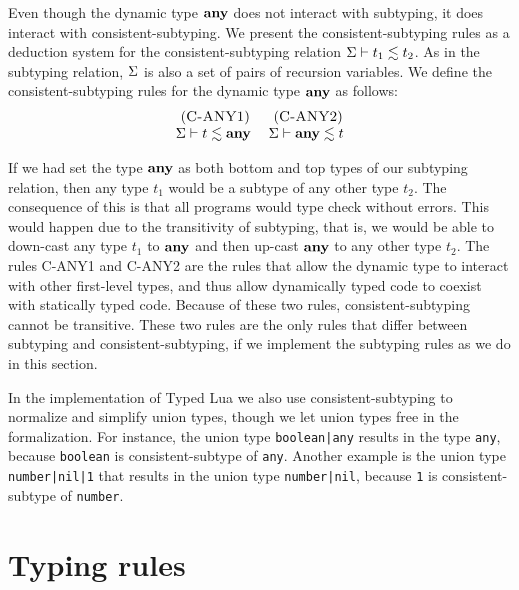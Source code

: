 Even though the dynamic type $\mathbf{any}$ does not interact with subtyping,
it does interact with consistent-subtyping.
We present the consistent-subtyping rules as a deduction system for
the consistent-subtyping relation $\Sigma \vdash t_{1} \lesssim t_{2}$.
As in the subtyping relation, $\Sigma$ is also a set of pairs of
recursion variables.
We define the consistent-subtyping rules for the dynamic type $\mathbf{any}$
as follows:
\[
\begin{array}{c}
\begin{array}{c}
\; (\textsc{C-ANY1})\\
\Sigma \vdash t \lesssim \mathbf{any}
\end{array}
\;
\begin{array}{c}
\; (\textsc{C-ANY2})\\
\Sigma \vdash \mathbf{any} \lesssim t
\end{array}
\end{array}
\]

If we had set the type $\mathbf{any}$ as both bottom and top types of our
subtyping relation, then any type $t_{1}$ would be a subtype of
any other type $t_{2}$.
The consequence of this is that all programs would type check without errors.
This would happen due to the transitivity of subtyping, that is,
we would be able to down-cast any type $t_{1}$ to $\mathbf{any}$ and then up-cast
$\mathbf{any}$ to any other type $t_{2}$.
The rules \textsc{C-ANY1} and \textsc{C-ANY2} are the rules that
allow the dynamic type to interact with other first-level types,
and thus allow dynamically typed code to coexist with statically
typed code.
Because of these two rules, consistent-subtyping cannot be transitive.
These two rules are the only rules that differ between
subtyping and consistent-subtyping, if we implement the subtyping rules
as we do in this section.

In the implementation of Typed Lua we also use consistent-subtyping to
normalize and simplify union types, though we let union types free in
the formalization.
For instance, the union type \texttt{boolean|any} results in the
type \texttt{any}, because \texttt{boolean} is consistent-subtype
of \texttt{any}.
Another example is the union type \texttt{number|nil|1} that
results in the union type \texttt{number|nil}, because
\texttt{1} is consistent-subtype of \texttt{number}.

\section{Typing rules}
\label{sec:rules}

